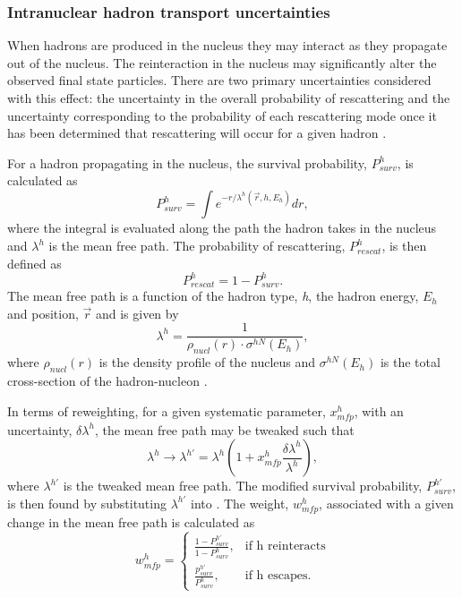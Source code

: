 \subsubsection*{Intranuclear hadron transport uncertainties}
When hadrons are produced in the nucleus they may interact as they propagate out of the nucleus. The reinteraction in the nucleus may significantly alter the observed final state particles. There are two primary uncertainties considered with this effect: the uncertainty in the overall probability of rescattering and the uncertainty corresponding to the probability of each rescattering mode once it has been determined that rescattering will occur for a given hadron \cite{GENIE_manual}. 

For a hadron propagating in the nucleus, the survival probability, $P_{surv}^h$, is calculated as
\begin{equation}
    P_{surv}^h = \int e^{-r/ \lambda^h(\vec r, h, E_h)} dr,
\label{eq:intranuclear_survival_prob}
\end{equation}
where the integral is evaluated along the path the hadron takes in the nucleus and $\lambda^h$ is the mean free path. The probability of rescattering, $P^h_{rescat}$, is then defined as 
\begin{equation}
    P_{rescat}^h = 1 - P_{surv}^h.
\end{equation}
The mean free path is a function of the hadron type, \textit{h}, the hadron energy, $E_h$ and position, $\vec r$ and is given by
\begin{equation}
    \lambda^h = \frac{1}{\rho_{nucl}(r) \cdot \sigma^{hN}(E_h)},
\end{equation}
where $\rho_{nucl}(r)$ is the density profile of the nucleus and $\sigma^{hN}(E_h)$ is the total cross-section of the hadron-nucleon \cite{GENIE_manual}. 

In terms of reweighting, for a given systematic parameter, $x^h_{mfp}$, with an uncertainty, $\delta \lambda^h$, the mean free path may be tweaked such that
\begin{equation}
    \lambda^h \rightarrow \lambda^{h\prime} = \lambda^h \left(1 + x^h_{mfp} \frac{\delta \lambda^h}{\lambda^h} \right),
\end{equation}
where $\lambda^{h\prime}$ is the tweaked mean free path. The modified survival probability, $P_{surv}^{h\prime}$, is then found by substituting $\lambda^{h\prime}$ into . The weight, $w^h_{mfp}$, associated with a given change in the mean free path is calculated as \cite{GENIE_manual}
\begin{equation}
  w^h_{mfp}=\begin{cases}
    \frac{1-P^{h\prime}_{surv}}{1-P^h_{surv}}, & \text{if h reinteracts}\\
    \frac{p^{h\prime}_{surv}}{P^{h}_{surv}}, & \text{if h escapes}.
  \end{cases}
\end{equation}

